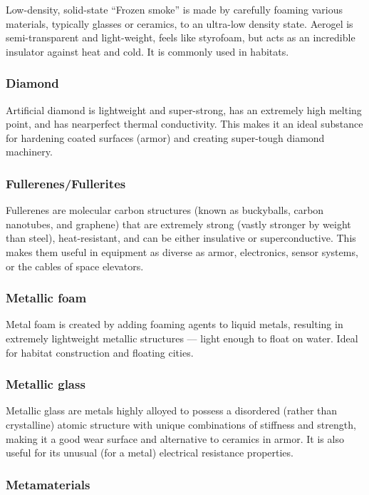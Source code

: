 Low-density, solid-state ``Frozen smoke'' is made by carefully foaming various materials, typically glasses or ceramics, to an ultra-low density state. Aerogel is semi-transparent and light-weight, feels like styrofoam, but acts as an incredible insulator against heat and cold. It is commonly used in habitats. 

\subsubsection{Diamond} 

Artificial diamond is lightweight and super-strong, has an extremely high melting point, and has nearperfect thermal conductivity. This makes it an ideal substance for hardening coated surfaces (armor) and creating super-tough diamond machinery. 

\subsubsection{Fullerenes/Fullerites} 

Fullerenes are molecular carbon structures (known as buckyballs, carbon nanotubes, and graphene) that are extremely strong (vastly stronger by weight than steel), heat-resistant, and can be either insulative or superconductive. This makes them useful in equipment as diverse as armor, electronics, sensor systems, or the cables of space elevators. 

\subsubsection{Metallic foam} 

Metal foam is created by adding foaming agents to liquid metals, resulting in extremely lightweight metallic structures --- light enough to float on water. Ideal for habitat construction and floating cities. 

\subsubsection{Metallic glass} 

Metallic glass are metals highly alloyed to possess a disordered (rather than crystalline) atomic structure with unique combinations of stiffness and strength, making it a good wear surface and alternative to ceramics in armor. It is also useful for its unusual (for a metal) electrical resistance properties. 

\subsubsection{Metamaterials} 

